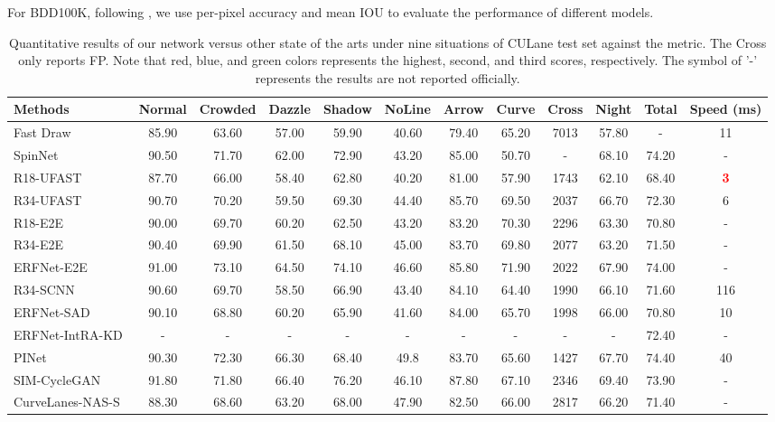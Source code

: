 \documentclass[preprint,12pt,review]{elsarticle}
\begin{document}
For BDD100K, following \cite{distillation}, we use per-pixel accuracy and mean IOU to evaluate the performance of different models.
\begin{table*}[htbp]
\centering
	\caption{Quantitative results of our network versus other state of the arts under nine situations of CULane test set against the  metric. The Cross only reports FP. Note that red, blue, and green colors represents the highest, second, and third scores, respectively. The symbol of '-' represents the results are not reported officially. }
	\resizebox{\textwidth}{!}
	{
		\setlength\tabcolsep{1pt}
		\renewcommand\arraystretch{1.6}
		\begin{tabular}{l||ccccccccc|c|c}
			\toprule[1pt]
			Methods  &Normal  &Crowded  &Dazzle  &Shadow &NoLine  &Arrow &Curve &Cross &Night &Total &Speed (ms)\\
			\hline
			\hline
			Fast Draw~\cite{fastdraw} &85.90  &63.60 &57.00 &59.90 &40.60 &79.40 &65.20 &7013 &57.80 &- &11 \\
			SpinNet~\cite{spinnet} &90.50 &71.70 &62.00 &72.90 &43.20 &85.00 &50.70 &-  &68.10 &74.20 &-\\
			R18-UFAST~\cite{ufast}&87.70 &66.00 &58.40 &62.80 &40.20 &81.00 &57.90 &1743 &62.10 &68.40 &\textcolor{red}{\bf{3}}\\
			R34-UFAST~\cite{ufast}&90.70 &70.20 &59.50 &69.30 &44.40 &85.70 &69.50 &2037 &66.70 &72.30 &6\\
			R18-E2E~\cite{e2e}&90.00 &69.70 &60.20 &62.50 &43.20 &83.20 &70.30 &2296 &63.30 &70.80 &-\\
			R34-E2E~\cite{e2e} &90.40 &69.90 &61.50 &68.10 &45.00 &83.70 &69.80 &2077 &63.20 &71.50 &-\\
			ERFNet-E2E~\cite{e2e} &91.00 &73.10 &64.50 &74.10 &46.60 &85.80 &71.90 & 2022 &67.90 &74.00&-\\
			R34-SCNN~\cite{SCNN} &90.60 &69.70 &58.50 &66.90 &43.40 &84.10 &64.40 &1990 &66.10 &71.60 &116\\
			ERFNet-SAD~\cite{distillation} &90.10 &68.80 &60.20 &65.90 &41.60 &84.00 &65.70 &1998 &66.00 &70.80 &10\\ 
			ERFNet-IntRA-KD &- &- &- &- &- &- &- &- &- &72.40 &-\\
			PINet~\cite{PINet} &90.30 &72.30 &66.30 &68.40 &49.8 &83.70 &65.60 &1427 &67.70 &74.40 &40\\
			SIM-CycleGAN\cite{liulane} &91.80 &71.80 &66.40 &76.20 &46.10 &87.80 &67.10 &2346 &69.40 &73.90 &-\\
			CurveLanes-NAS-S~\cite{curvelane} &88.30 &68.60 &63.20 &68.00 &47.90 &82.50 &66.00 &2817 &66.20 &71.40 &-\\

\end{tabular}}
\end{table*}
\end{document}
